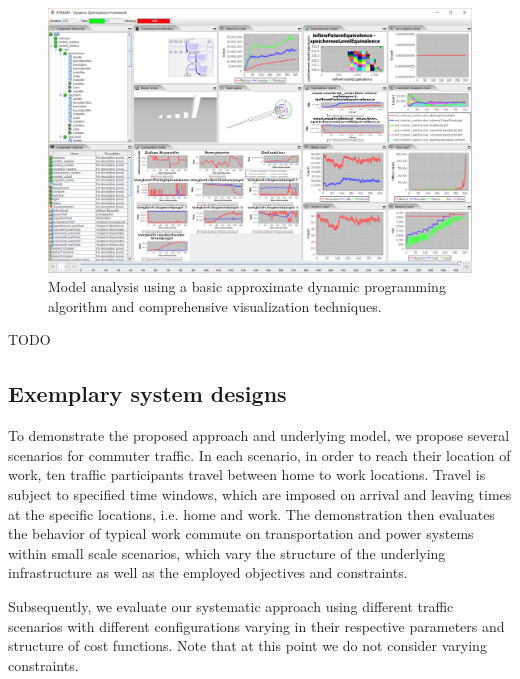\begin{figure}[h]
	\includegraphics[width=\columnwidth]{./gfx/analysis.png}
	\caption{Model analysis using a basic approximate dynamic programming algorithm and comprehensive visualization techniques.}
	\label{figure:analysis}
\end{figure}

TODO

\subsection{Exemplary system designs}
\label{examples}

To demonstrate the proposed approach and underlying model, we propose several scenarios for commuter traffic. In each scenario, in order to reach their location of work, ten traffic participants travel between home to work locations. Travel is subject to specified time windows, which are imposed on arrival and leaving times at the specific locations, i.e. home and work. The demonstration then evaluates the behavior of typical work commute on transportation and power systems within small scale scenarios, which vary the structure of the underlying infrastructure as well as the employed objectives and constraints.

Subsequently, we evaluate our systematic approach using different traffic scenarios with different configurations varying in their respective parameters and structure of cost functions. Note that at this point we do not consider varying constraints. 



